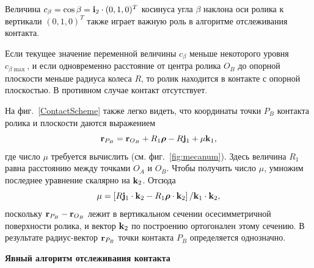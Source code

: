 Величина $c_{\beta }=\cos\beta ={\bf i}_2\cdot (0,1,0)^T$ косинуса угла $\beta $ наклона оси ролика к вертикали $(0,1,0)^T$ также играет важную роль в алгоритме отслеживания контакта.

Если текущее значение переменной величины $c_{\beta }$ меньше некоторого уровня $c_{\beta\max }$, и если одновременно расстояние от центра ролика $O_B$ до опорной плоскости меньше радиуса колеса $R$, то ролик находится в контакте с опорной плоскостью. В противном случае контакт отсутствует.


На фиг.~\ref{ContactScheme} также легко видеть, что координаты точки $P_B$ контакта ролика и плоскости даются выражением
$$
{\bf r}_{P_B}={\bf r}_{O_B}+R_1\boldsymbol{\mathbf{\rho}} -R{\bf j}_1+\mu {\bf k}_1,
$$
где число $\mu$ требуется вычислить (см. фиг.~\ref{fig:mecanum}). Здесь величина $R_1$ равна расстоянию между точками $O_A$ и $O_B$.
Чтобы получить число $\mu$, умножим последнее уравнение скалярно на ${\bf k}_2$. Отсюда
$$
\mu =\left[R{\bf j}_1\cdot{\bf k}_2-R_1{\boldsymbol{\mathbf{\rho}} }\cdot {\bf k}_2\right] /
{\bf k}_1\cdot{\bf k}_2,
$$
поскольку ${\bf r}_{P_B}-{\bf r}_{O_B}$ лежит в вертикальном сечении осесимметричной поверхности ролика, и вектор ${\bf k}_2$ по построению ортогонален этому сечению. В результате радиус-вектор ${\bf r}_{P_B}$ точки контакта $P_B$ определяется однозначно.

\textbf{Явный алгоритм отслеживания контакта}

